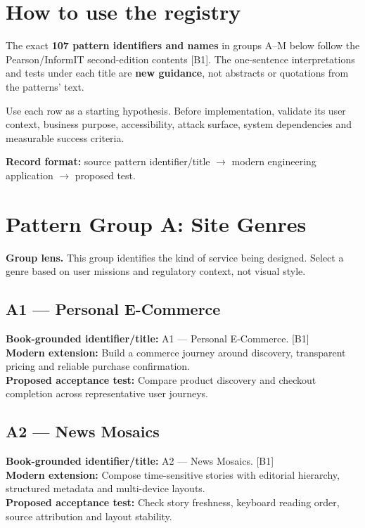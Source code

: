 \documentclass[11pt]{article}
\begin{document}
\MakeFront
\section{How to use the registry}
\Provenance
\begin{groundedbox}The exact \textbf{107 pattern identifiers and names} in groups A--M below follow the Pearson/InformIT second-edition contents [B1]. The one-sentence interpretations and tests under each title are \textbf{new guidance}, not abstracts or quotations from the patterns' text.\end{groundedbox}
\begin{modernbox}Use each row as a starting hypothesis. Before implementation, validate its user context, business purpose, accessibility, attack surface, system dependencies and measurable success criteria.\end{modernbox}
\textbf{Record format:} source pattern identifier/title $\rightarrow$ modern engineering application $\rightarrow$ proposed test.\par

\section{Pattern Group A: Site Genres}

\begin{notebox}\textbf{Group lens.} This group identifies the kind of service being designed. Select a genre based on user missions and regulatory context, not visual style.\end{notebox}
\subsection{A1 — Personal E-Commerce}
\noindent\textcolor{Ocean}{\textbf{Book-grounded identifier/title:}} A1 — Personal E-Commerce. [B1]\\
\textcolor{Mint}{\textbf{Modern extension:}} Build a commerce journey around discovery, transparent pricing and reliable purchase confirmation.\\
\textcolor{Amber}{\textbf{Proposed acceptance test:}} Compare product discovery and checkout completion across representative user journeys.\medskip
\subsection{A2 — News Mosaics}
\noindent\textcolor{Ocean}{\textbf{Book-grounded identifier/title:}} A2 — News Mosaics. [B1]\\
\textcolor{Mint}{\textbf{Modern extension:}} Compose time-sensitive stories with editorial hierarchy, structured metadata and multi-device layouts.\\
\textcolor{Amber}{\textbf{Proposed acceptance test:}} Check story freshness, keyboard reading order, source attribution and layout stability.\medskip
\end{document}
